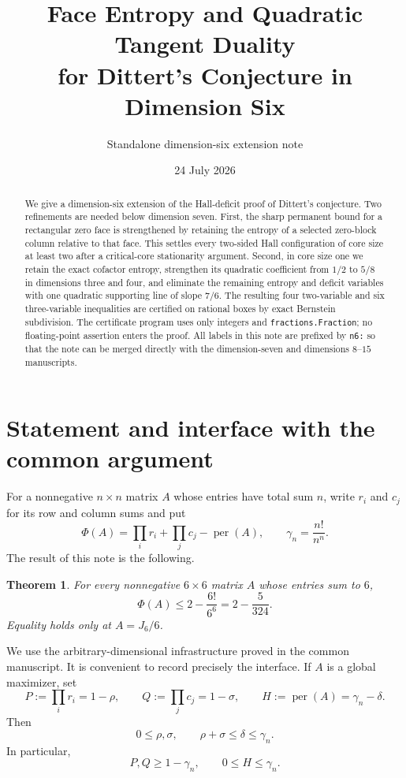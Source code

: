 \documentclass[11pt]{article}
\title{Face Entropy and Quadratic Tangent Duality\\
for Dittert's Conjecture in Dimension Six}
\author{Standalone dimension-six extension note}
\date{24 July 2026}
\numberwithin{equation}{section}
\newtheorem{theorem}{Theorem}[section]
\theoremstyle{definition}
\newcommand{\per}{\operatorname{per}}
\begin{document}
\maketitle

\begin{abstract}
We give a dimension-six extension of the Hall-deficit proof of Dittert's
conjecture.  Two refinements are needed below dimension seven.  First, the
sharp permanent bound for a rectangular zero face is strengthened by retaining
the entropy of a selected zero-block column relative to that face.  This
settles every two-sided Hall configuration of core size at least two after a
critical-core stationarity argument.  Second, in core size one we retain the
exact cofactor entropy, strengthen its quadratic coefficient from $1/2$ to
$5/8$ in dimensions three and four, and eliminate the remaining entropy and
deficit variables with one quadratic supporting line of slope $7/6$.  The
resulting four two-variable and six three-variable inequalities are certified
on rational boxes by exact Bernstein subdivision.  The certificate program
uses only integers and \texttt{fractions.Fraction}; no floating-point assertion
enters the proof.  All labels in this note are prefixed by \texttt{n6:} so that
the note can be merged directly with the dimension-seven and dimensions
$8$--$15$ manuscripts.
\end{abstract}

\section{Statement and interface with the common argument}\label{n6:sec:setup}

For a nonnegative $n\times n$ matrix $A$ whose entries have total sum $n$,
write $r_i$ and $c_j$ for its row and column sums and put
\[
 \Phi(A)=\prod_i r_i+\prod_j c_j-\per(A),
 \qquad
 \gamma_n=\frac{n!}{n^n}.
\]
The result of this note is the following.

\begin{theorem}\label{n6:thm:main}
For every nonnegative $6\times6$ matrix $A$ whose entries sum to $6$,
\[
 \Phi(A)\le 2-\frac{6!}{6^6}=2-\frac5{324}.
\]
Equality holds only at $A=J_6/6$.
\end{theorem}

We use the arbitrary-dimensional infrastructure proved in the common
manuscript.  It is convenient to record precisely the interface.  If $A$ is a
global maximizer, set
\[
 P:=\prod_i r_i=1-\rho,
 \qquad
 Q:=\prod_j c_j=1-\sigma,
 \qquad
 H:=\per(A)=\gamma_n-\delta.
\]
Then
\begin{equation}
 0\le \rho,\sigma,
 \qquad
 \rho+\sigma\le\delta\le\gamma_n.\label{n6:eq:budget}
\end{equation}
In particular,
\begin{equation}
 P,Q\ge1-\gamma_n,
 \qquad
 0\le H\le\gamma_n.\label{n6:eq:basic-deficit}
\end{equation}
\end{document}
